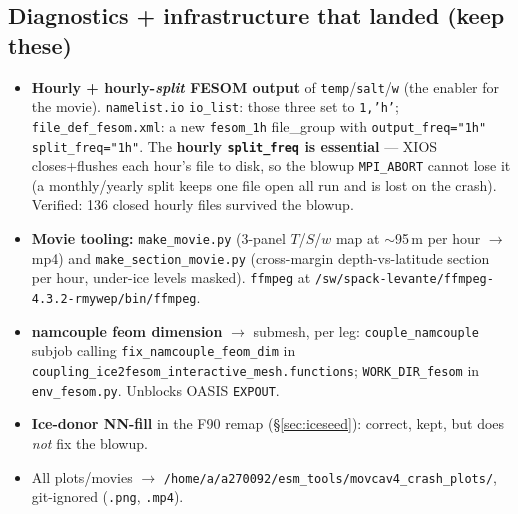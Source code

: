 \documentclass[11pt,a4paper]{article}
\newcommand{\code}[1]{\texttt{\small #1}}
\newcommand{\file}[1]{\texttt{\footnotesize #1}}
\begin{document}
\subsection{Diagnostics + infrastructure that landed (keep these)}\label{sec:current-fixes}
\begin{itemize}[leftmargin=1.4em,itemsep=2pt]
  \item \textbf{Hourly + hourly-\emph{split} FESOM output} of \code{temp}/\code{salt}/\code{w}
        (the enabler for the movie). \file{namelist.io} \code{io\_list}: those three set to
        \code{1,'h'}; \file{file\_def\_fesom.xml}: a new \code{fesom\_1h} file\_group with
        \code{output\_freq="1h" split\_freq="1h"}. The \textbf{hourly \code{split\_freq} is
        essential} --- XIOS closes+flushes each hour's file to disk, so the blowup
        \code{MPI\_ABORT} cannot lose it (a monthly/yearly split keeps one file open all run
        and is lost on the crash). Verified: 136 closed hourly files survived the blowup.
  \item \textbf{Movie tooling:} \file{make\_movie.py} (3-panel $T$/$S$/$w$ map at $\sim$95\,m
        per hour $\to$ mp4) and \file{make\_section\_movie.py} (cross-margin depth-vs-latitude
        section per hour, under-ice levels masked). \code{ffmpeg} at
        \file{/sw/spack-levante/ffmpeg-4.3.2-rmywep/bin/ffmpeg}.
  \item \textbf{namcouple feom dimension} $\to$ submesh, per leg: \code{couple\_namcouple}
        subjob calling \code{fix\_namcouple\_feom\_dim} in
        \file{coupling\_ice2fesom\_interactive\_mesh.functions}; \code{WORK\_DIR\_fesom} in
        \file{env\_fesom.py}. Unblocks OASIS \code{EXPOUT}.
  \item \textbf{Ice-donor NN-fill} in the F90 remap (\S\ref{sec:iceseed}): correct, kept, but
        does \emph{not} fix the blowup.
  \item All plots/movies $\to$ \file{/home/a/a270092/esm\_tools/movcav4\_crash\_plots/},
        git-ignored (\code{*.png}, \code{*.mp4}).
\end{itemize}
\end{document}
